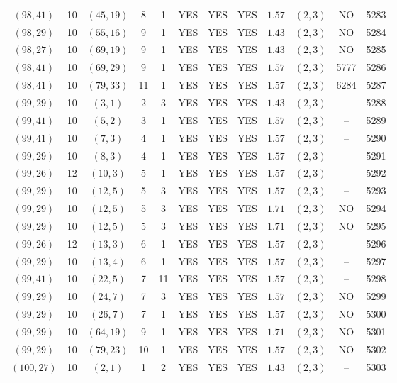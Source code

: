 \begin{longtable}{|c|c|c|c|c|c|c|c|c|c|c|c|}
$(98,41)$ & 10 & $(45,19)$ & 8 & 1 & YES & YES & YES & $1.57$ & $(2,3)$ & NO & 5283\\
$(98,29)$ & 10 & $(55,16)$ & 9 & 1 & YES & YES & YES & $1.43$ & $(2,3)$ & NO & 5284\\
$(98,27)$ & 10 & $(69,19)$ & 9 & 1 & YES & YES & YES & $1.43$ & $(2,3)$ & NO & 5285\\
$(98,41)$ & 10 & $(69,29)$ & 9 & 1 & YES & YES & YES & $1.57$ & $(2,3)$ & 5777 & 5286\\
$(98,41)$ & 10 & $(79,33)$ & 11 & 1 & YES & YES & YES & $1.57$ & $(2,3)$ & 6284 & 5287\\
$(99,29)$ & 10 & $(3,1)$ & 2 & 3 & YES & YES & YES & $1.43$ & $(2,3)$ & -- & 5288\\
$(99,41)$ & 10 & $(5,2)$ & 3 & 1 & YES & YES & YES & $1.57$ & $(2,3)$ & -- & 5289\\
$(99,41)$ & 10 & $(7,3)$ & 4 & 1 & YES & YES & YES & $1.57$ & $(2,3)$ & -- & 5290\\
$(99,29)$ & 10 & $(8,3)$ & 4 & 1 & YES & YES & YES & $1.57$ & $(2,3)$ & -- & 5291\\
$(99,26)$ & 12 & $(10,3)$ & 5 & 1 & YES & YES & YES & $1.57$ & $(2,3)$ & -- & 5292\\
$(99,29)$ & 10 & $(12,5)$ & 5 & 3 & YES & YES & YES & $1.57$ & $(2,3)$ & -- & 5293\\
$(99,29)$ & 10 & $(12,5)$ & 5 & 3 & YES & YES & YES & $1.71$ & $(2,3)$ & NO & 5294\\
$(99,29)$ & 10 & $(12,5)$ & 5 & 3 & YES & YES & YES & $1.71$ & $(2,3)$ & NO & 5295\\
$(99,26)$ & 12 & $(13,3)$ & 6 & 1 & YES & YES & YES & $1.57$ & $(2,3)$ & -- & 5296\\
$(99,29)$ & 10 & $(13,4)$ & 6 & 1 & YES & YES & YES & $1.57$ & $(2,3)$ & -- & 5297\\
$(99,41)$ & 10 & $(22,5)$ & 7 & 11 & YES & YES & YES & $1.57$ & $(2,3)$ & -- & 5298\\
$(99,29)$ & 10 & $(24,7)$ & 7 & 3 & YES & YES & YES & $1.57$ & $(2,3)$ & NO & 5299\\
$(99,29)$ & 10 & $(26,7)$ & 7 & 1 & YES & YES & YES & $1.57$ & $(2,3)$ & NO & 5300\\
$(99,29)$ & 10 & $(64,19)$ & 9 & 1 & YES & YES & YES & $1.71$ & $(2,3)$ & NO & 5301\\
$(99,29)$ & 10 & $(79,23)$ & 10 & 1 & YES & YES & YES & $1.57$ & $(2,3)$ & NO & 5302\\
$(100,27)$ & 10 & $(2,1)$ & 1 & 2 & YES & YES & YES & $1.43$ & $(2,3)$ & -- & 5303\\

\end{longtable}
